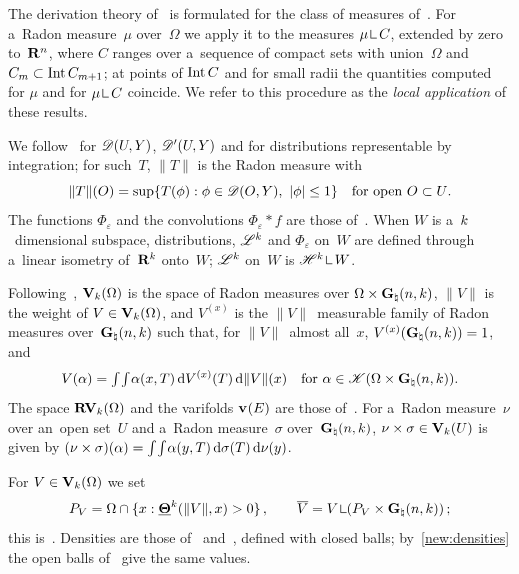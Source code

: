 \documentclass[a4paper,twoside,leqno]{article}
\newcommand{\Gk}{\pgrass{\adim}{\vdim}}        %
\begin{document}
\begin{miniremark}
    The derivation theory of~\cite[2.8.18, 2.9]{Federer1969} is formulated for the class of
    measures of~\cite[2.9.1]{Federer1969}. For a~Radon measure~$\mu$ over~$\Omega$ we apply it to
    the measures $\mu \restrict C$, extended by zero to~$\mathbf{R}^{n}$, where $C$ ranges over
    a~sequence of compact sets with union~$\Omega$ and $C_m \subset \operatorname{Int} C_{m+1}$; at points of
    $\operatorname{Int} C$ and for small radii the quantities computed for $\mu$ and for $\mu \restrict C$
    coincide. We refer to this procedure as the \emph{local application} of these results.

    We follow~\cite[4.1.1, 4.1.5]{Federer1969} for $\mathscr{D}(U,Y)$, $\mathscr{D}'(U,Y)$ and for
    distributions representable by integration; for such~$T$, $\|T\|$ is the Radon measure with
    \begin{equation}
        \label{eq:mr:notation:var}
        \|T\|(O) = \sup \{ T(\phi) : \phi \in \mathscr{D}(O,Y),\ |\phi| \le 1 \} \quad \text{for open $O
        \subset U$}.
    \end{equation}
    The functions $\Phi_\varepsilon$ and the convolutions $\Phi_\varepsilon * f$ are those
    of~\cite[4.1.2]{Federer1969}. When $W$ is a~$k$~dimensional subspace, distributions,
    $\mathscr{L}^{k}$ and $\Phi_\varepsilon$ on~$W$ are defined through a~linear isometry of~$\mathbf{R}^{k}$
    onto~$W$; $\mathscr{L}^{k}$ on~$W$ is $\HM^{\vdim} \restrict W$.

    Following~\cite[3.1, 3.3, 3.5]{Allard1972}, $\mathbf{V}_{k}(\Omega)$ is the space of Radon
    measures over $\Omega \times \Gk$, $\|V\|$ is the weight of $V \in \mathbf{V}_{k}(\Omega)$, and
    $V^{(x)}$ is the $\|V\|$~measurable family of Radon measures over~$\Gk$ such that, for
    $\|V\|$~almost all~$x$, $V^{(x)}(\Gk) = 1$, and
    \begin{equation}
        \label{eq:mr:notation:disint}
        V(\alpha) = \textint{}{} \textint{}{} \alpha(x,T) \ud V^{(x)}(T) \ud \|V\|(x) \quad
        \text{for $\alpha \in \ccspace{\Omega \times \Gk}$}.
    \end{equation}
    The space $\mathbf{RV}_{k}(\Omega)$ and the varifolds $\mathbf{v}_{}(E)$ are those
    of~\cite[3.5]{Allard1972}. For a~Radon measure~$\nu$ over an~open set~$U$ and a~Radon
    measure~$\sigma$ over~$\Gk$, $\nu \times \sigma \in \mathbf{V}_{k}(U)$ is given by $(\nu
    \times \sigma)(\alpha) = {\textstyle\int_{}^{}} {\textstyle\int_{}^{}} \alpha(y,T) \,\mathrm{d} \sigma(T) \,\mathrm{d} \nu(y)$.

    For $V \in \mathbf{V}_{k}(\Omega)$ we set
    \begin{displaymath}
        P_V = \Omega \cap \{ x : \ldensity^{\vdim}(\|V\|,x) > 0 \} \,, \qquad \overline V = V
        \restrict (P_V \times \Gk) \,;
    \end{displaymath}
    this is~\cite[(1.2)]{DePhilippis2018}. Densities are those of~\cite[2.10.19]{Federer1969}
    and~\cite[2.8(2)]{Allard1972}, defined with closed balls; by~\ref{new:densities} the open
    balls of~\cite[p.~1126]{DePhilippis2018} give the same values.
\end{miniremark}
\end{document}
